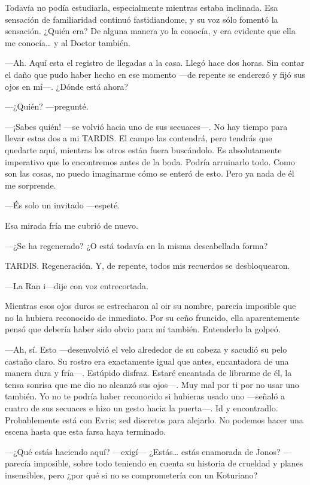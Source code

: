 Todavía no podía estudiarla, especialmente mientras estaba inclinada.
Esa sensación de familiaridad continuó fastidiandome, y su voz sólo
fomentó la sensación. ¿Quién era? De alguna manera yo la conocía, y era
evidente que ella me conocía\ldots{} y al Doctor también.

---Ah. Aquí esta el registro de llegadas a la casa. Llegó hace dos
horas. Sin contar el daño que pudo haber hecho en ese momento ---de
repente se enderezó y fijó sus ojos en mí---. ¿Dónde está ahora?

---¿Quién? ---pregunté.

---¡Sabes quién! ---se volvió hacia uno de sus secuaces---. No hay
tiempo para llevar estas dos a mi TARDIS. El campo las contendrá, pero
tendrás que quedarte aquí, mientras los otros están fuera buscándolo. Es
absolutamente imperativo que lo encontremos antes de la boda. Podría
arruinarlo todo. Como son las cosas, no puedo imaginarme cómo se enteró
de esto. Pero ya nada de él me sorprende.

---És solo un invitado ---espeté.

Esa mirada fría me cubrió de nuevo.

---¿Se ha regenerado? ¿O está todavía en la misma descabellada forma?

TARDIS. Regeneración. Y, de repente, todos mis recuerdos se
desbloquearon.

---La Ran i---dije con voz entrecortada.

Mientras esos ojos duros se estrecharon al oir su nombre, parecía
imposible que no la hubiera reconocido de inmediato. Por su ceño
fruncido, ella aparentemente pensó que debería haber sido obvio para mí
también. Entenderlo la golpeó.

---Ah, sí. Esto ---desenvolvió el velo alrededor de su cabeza y sacudió
su pelo castaño claro. Su rostro era exactamente igual que antes,
encantadora de una manera dura y fría---. Estúpido disfraz. Estaré
encantada de librarme de él, la tensa sonrisa que me dio no alcanzó sus
ojos---. Muy mal por ti por no usar uno también. Yo no te podría haber
reconocido si hubieras usado uno ---señaló a cuatro de sus secuaces e
hizo un gesto hacia la puerta---. Id y encontradlo. Probablemente está
con Evris; sed discretos para alejarlo. No podemos hacer una escena
hasta que esta farsa haya terminado.

---¿Qué estás haciendo aquí? ---exigí--- ¿Estás\ldots{} estás enamorada
de Jonos? ---parecía imposible, sobre todo teniendo en cuenta su
historia de crueldad y planes insensibles, pero ¿por qué si no se
comprometería con un Koturiano?

